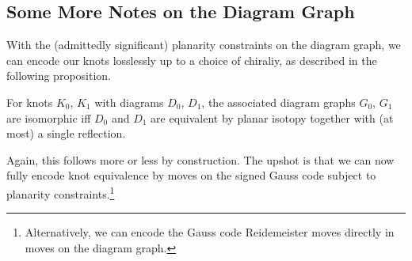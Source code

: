 
\subsection{Some More Notes on the Diagram Graph}
With the (admittedly significant) planarity constraints on the diagram
graph, we can encode our knots losslessly up to a choice of chiraliy,
as described in the following proposition.
\begin{proposition}
  For knots $K_0$, $K_1$ with diagrams $D_0$, $D_1$, the associated
  diagram graphs $G_0$, $G_1$ are isomorphic iff $D_0$ and $D_1$ are
  equivalent by planar isotopy together with (at most) a single
  reflection.
\end{proposition}
Again, this follows more or less by construction. The upshot is that
we can now fully encode knot equivalence by moves on the signed Gauss
code subject to planarity constraints.\footnote{Alternatively, we can
  encode the Gauss code Reidemeister moves directly in moves on the
  diagram graph.}

